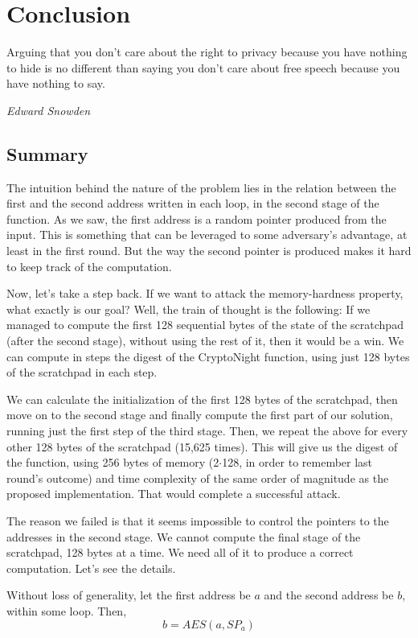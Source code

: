 \chapter{Conclusion}
%
\epigraph{Arguing that you don't care about the right to privacy because you have nothing to hide is no different than saying you don't care about free speech because you have nothing to say.}{\textit{Edward Snowden}}
%
\section{Summary}
The intuition behind the nature of the problem lies in the relation between the first and the second address written in each loop, in the second stage of the function. As we saw, the first address is a random pointer produced from the input. This is something that can be leveraged to some adversary's advantage, at least in the first round. But the way the second pointer is produced makes it hard to keep track of the computation.

Now, let's take a step back. If we want to attack the memory-hardness property, what exactly is our goal? Well, the train of thought is the following: If we managed to compute the first 128 sequential bytes of the state of the scratchpad (after the second stage), without using the rest of it, then it would be a win. We can compute in steps the digest of the CryptoNight function, using just 128 bytes of the scratchpad in each step.

We can calculate the initialization of the first 128 bytes of the scratchpad, then move on to the second stage and finally compute the first part of our solution, running just the first step of the third stage. Then, we repeat the above for every other 128 bytes of the scratchpad (15,625 times). This will give us the digest of the function, using 256 bytes of memory (2$\cdot$128, in order to remember last round's outcome) and time complexity of the same order of magnitude as the proposed implementation. That would complete a successful attack.
\pagebreak

The reason we failed is that it seems impossible to control the pointers to the addresses in the second stage. We cannot compute the final stage of the scratchpad, 128 bytes at a time. We need all of it to produce a correct computation. Let's see the details.

Without loss of generality, let the first address be $a$ and the second address be $b$, within some loop. Then,
\begin{equation} \nonumber
  b = AES(a,SP_a)
\end{equation}

